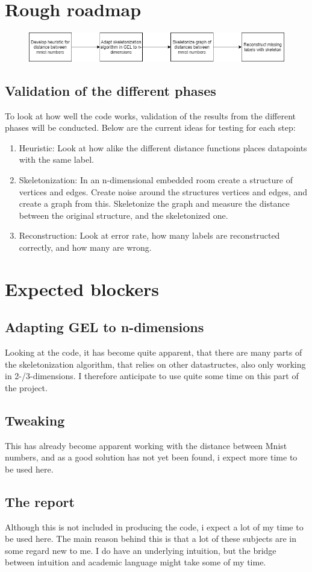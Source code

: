 \documentclass{article}
\begin{document}
\section{Rough roadmap}
\begin{figure}[!h]
    \centering
    \includegraphics[width=.9\textwidth]{datum/CoarseProjectPlan.png}
\end{figure}


\subsection{Validation of the different phases}
To look at how well the code works, validation of the results from the different phases will be conducted. Below are the current ideas for testing for each step:
\begin{enumerate}
    \item Heuristic: Look at how alike the different distance functions places datapoints with the same label.
    \item Skeletonization: In an n-dimensional embedded room create a structure of vertices and edges. Create noise around the structures vertices and edges, and create a graph from this. Skeletonize the graph and measure the distance between the original structure, and the skeletonized one.
    \item Reconstruction: Look at error rate, how many labels are reconstructed correctly, and how many are wrong.
\end{enumerate}


\section{Expected blockers}
\subsection{Adapting GEL to n-dimensions}
Looking at the code, it has become quite apparent, that there are many parts of the skeletonization algorithm, that relies on other datastructes, also only working in 2-/3-dimensions. I therefore anticipate to use quite some time on this part of the project.

\subsection{Tweaking}
This has already become apparent working with the distance between Mnist numbers, and as a good solution has not yet been found, i expect more time to be used here.

\subsection{The report}
Although this is not included in producing the code, i expect a lot of my time to be used here. The main reason behind this is that a lot of these subjects are in some regard new to me. I do have an underlying intuition, but the bridge between intuition and academic language might take some of my time. 
\end{document}
